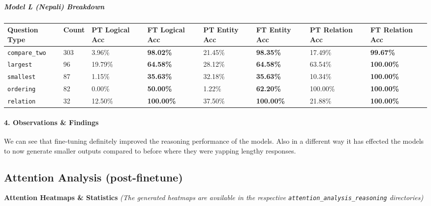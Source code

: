 \documentclass[10pt,a4paper]{article}
\begin{document}
\subparagraph{Model L (Nepali) Breakdown}
\begin{center}
\small
\begin{longtable}{l l l l l l l l}
\toprule
Question Type & Count & PT Logical Acc & FT Logical Acc & PT Entity Acc & FT Entity Acc & PT Relation Acc & FT Relation Acc \\
\midrule
\endhead
\texttt{compare\_two} & 303 & 3.96\% & \textbf{98.02\%} & 21.45\% & \textbf{98.35\%} & 17.49\% & \textbf{99.67\%} \\
\texttt{largest} & 96 & 19.79\% & \textbf{64.58\%} & 28.12\% & \textbf{64.58\%} & 63.54\% & \textbf{100.00\%} \\
\texttt{smallest} & 87 & 1.15\% & \textbf{35.63\%} & 32.18\% & \textbf{35.63\%} & 10.34\% & \textbf{100.00\%} \\
\texttt{ordering} & 82 & 0.00\% & \textbf{50.00\%} & 1.22\% & \textbf{62.20\%} & 100.00\% & \textbf{100.00\%} \\
\texttt{relation} & 32 & 12.50\% & \textbf{100.00\%} & 37.50\% & \textbf{100.00\%} & 21.88\% & \textbf{100.00\%} \\
\bottomrule
\end{longtable}
\end{center}

\paragraph{4. Observations \& Findings}
We can see that fine-tuning definitely improved the reasoning performance of the models. Also in a different way it has effected the models to now generate smaller outputs compared to before where they were yapping lengthy responses.

\subsection{Attention Analysis (post-finetune)}

\textbf{Attention Heatmaps \& Statistics}
\emph{(The generated heatmaps are available in the respective \texttt{attention\_analysis\_reasoning} directories)}
\end{document}
